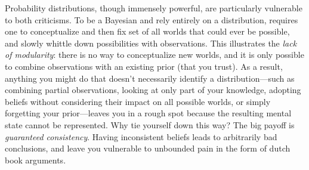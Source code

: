 \documentclass{article}
\newcommand\changed[1]{{\color{note-fg} #1}}
\newcommand\changeoff{\color{black} }
\begin{document}
	

	\changeoff
	
	\changed{Probability distributions, though immensely powerful, are particularly vulnerable to both criticisms. To be a Bayesian and rely entirely on a distribution, requires one to conceptualize and then fix set of all worlds that could ever be possible, and slowly whittle down possibilities with observations. This illustrates the} \textit{lack of modularity}: there is no way to conceptualize new worlds, and it is only possible to combine observations with an existing prior (that you trust). \changed{As a result, anything you might do that doesn't necessarily identify a distribution---such as combining partial observations, looking at only part of your knowledge, adopting beliefs without considering their impact on all possible worlds, or simply forgetting your prior---leaves you in a rough spot because the resulting mental state cannot be represented}.
	Why tie yourself down this way? The big payoff is \textit{guaranteed consistency}. Having inconsistent beliefs leads to arbitrarily bad conclusions, and leave you vulnerable to unbounded pain in the form of dutch book arguments. %
	
\end{document}
